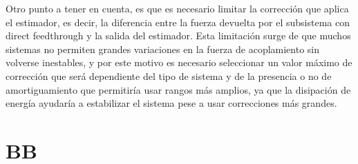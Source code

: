 Otro punto a tener en cuenta, es que es necesario limitar la corrección que aplica el estimador, es decir, la diferencia entre la fuerza devuelta por el subsistema con direct feedthrough y la salida del estimador.
Esta limitación surge de que muchos sistemas no permiten grandes variaciones en la fuerza de acoplamiento sin volverse inestables, y por este motivo es necesario seleccionar un valor máximo de corrección que será dependiente del tipo de sistema y de la presencia o no de amortiguamiento que permitiría usar rangos más amplios, ya que la disipación de energía ayudaría a estabilizar el sistema pese a usar correcciones más grandes.

\section{BB}

